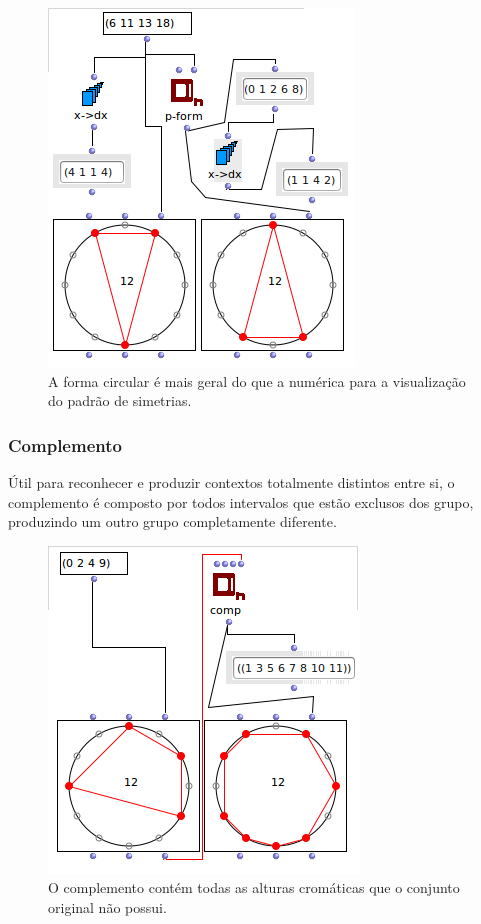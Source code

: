 \documentclass[
	12pt,				%
	openright,			%
	twoside,			%
	a4paper,			%
	english,			%
	french,				%
	spanish,			%
	brazil				%
	]{abntex2}
\begin{document}
\begin{figure}[!h]
	\caption{\label{fig_grafico}A forma circular é mais geral do que a numérica para a visualização do padrão de simetrias. }
	\begin{center}
	    \includegraphics[scale=0.6]{OM_settheory/palindrome2.png}
	\end{center}
\end{figure}



\subsubsection{Complemento}

Útil para reconhecer e produzir contextos totalmente distintos entre si, o complemento é composto por todos intervalos que estão exclusos dos grupo, produzindo um outro grupo completamente diferente.


\begin{figure}[!h]
	\caption{\label{fig_grafico}O complemento contém todas as alturas cromáticas que o conjunto original não possui. }
	\begin{center}
	    \includegraphics[scale=0.6]{OM_settheory/complemento.png}
	\end{center}
\end{figure}
\end{document}
